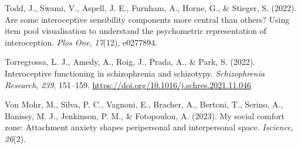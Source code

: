\documentclass[
  man,
  floatsintext,
  longtable,
  nolmodern,
  notxfonts,
  notimes,
  colorlinks=true,linkcolor=blue,citecolor=blue,urlcolor=blue]{apa7}
\newlength{\cslhangindent}
\newenvironment{CSLReferences}[2] %
 {\begin{list}{}{%
  \setlength{\itemindent}{0pt}
  \setlength{\leftmargin}{0pt}
  \setlength{\parsep}{0pt}
  \ifodd #1
   \setlength{\leftmargin}{\cslhangindent}
   \setlength{\itemindent}{-1\cslhangindent}
  \fi
  \setlength{\itemsep}{#2\baselineskip}}}
 {\end{list}}
\begin{document}
\begin{CSLReferences}{1}{0}
Todd, J., Swami, V., Aspell, J. E., Furnham, A., Horne, G., \& Stieger,
S. (2022). Are some interoceptive sensibility components more central
than others? Using item pool visualisation to understand the
psychometric representation of interoception. \emph{Plos One},
\emph{17}(12), e0277894.

Torregrossa, L. J., Amedy, A., Roig, J., Prada, A., \& Park, S. (2022).
Interoceptive functioning in schizophrenia and schizotypy.
\emph{Schizophrenia Research}, \emph{239}, 151--159.
\url{https://doi.org/10.1016/j.schres.2021.11.046}

Von Mohr, M., Silva, P. C., Vagnoni, E., Bracher, A., Bertoni, T.,
Serino, A., Banissy, M. J., Jenkinson, P. M., \& Fotopoulou, A. (2023).
My social comfort zone: Attachment anxiety shapes peripersonal and
interpersonal space. \emph{Iscience}, \emph{26}(2).

\end{CSLReferences}
\end{document}
